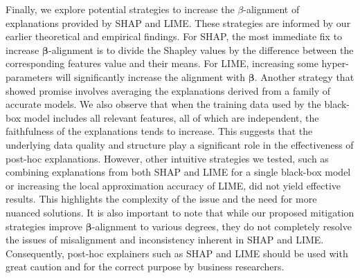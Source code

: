 \documentclass[mnsc,blindrev]{informs3}
\begin{document}
Finally, we explore potential strategies to increase the $\beta$-alignment of explanations provided by SHAP and LIME. These strategies are informed by our earlier theoretical and empirical findings. For SHAP, the most immediate fix to increase $\boldsymbol{\beta}$-alignment is to divide the Shapley values by the difference between the corresponding features value and their means. For LIME, increasing some hyper-parameters will significantly increase the alignment with $\boldsymbol{\beta}$.
Another strategy that showed promise involves averaging the explanations derived from a family of accurate models. We also observe that when the training data used by the black-box model includes all relevant features, all of which are independent, the faithfulness of the explanations tends to increase. This suggests that the underlying data quality and structure play a significant role in the effectiveness of post-hoc explanations.
However, other intuitive strategies we tested, such as combining explanations from both SHAP and LIME for a single black-box model or increasing the local approximation accuracy of LIME, did not yield effective results. This highlights the complexity of the issue and the need for more nuanced solutions.
It is also important to note that while our proposed mitigation strategies improve $\boldsymbol{\beta}$-alignment to various degrees, they do not completely resolve the issues of misalignment and inconsistency inherent in SHAP and LIME. Consequently, post-hoc explainers such as SHAP and LIME should be used with great caution and for the correct purpose by business researchers. %

    
 

   
\end{document}
